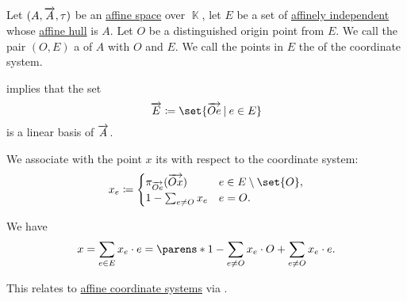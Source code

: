 \begin{definition}\label{def:barycentric_coordinate_system}
  Let \( (A, \overrightarrow{A}, \tau) \) be an \hyperref[def:affine_space]{affine space} over \( \BbbK \), let \( E \) be a set of \hyperref[def:affine_dependence]{affinely independent} whose \hyperref[def:affine_hull]{affine hull} is \( A \). Let \( O \) be a distinguished origin point from \( E \). We call the pair \( (O, E) \) a  of \( A \) with  \( O \) and  \( E \). We call the points in \( E \) the  of the coordinate system.

   implies that the set
  \begin{equation}\label{eq:def:barycentric_coordinate_system/linear_basis}
    \vect E \coloneqq \set{ \vect{Oe} \given e \in E }
  \end{equation}
  is a linear basis of \( \overrightarrow{A} \).

  We associate with the point \( x \) its  with respect to the coordinate system:
  \begin{equation*}
    x_e \coloneqq \begin{cases}
      \pi_{\vect{Oe}}(\vect{Ox}) &e \in E \setminus \set{ O }, \\
      1 - \sum_{e \neq O} x_e    &e = O.
    \end{cases}
  \end{equation*}

  We have
  \begin{equation}\label{eq:def:barycentric_coordinate_system/coordinates}
    x = \sum_{e \in E} x_e \cdot e = \parens*{ 1 - \sum_{e \neq O} x_e } \cdot O + \sum_{e \neq O} x_e \cdot e.
  \end{equation}

  This relates to \hyperref[def:affine_coordinate_system]{affine coordinate systems} via .
\end{definition}

